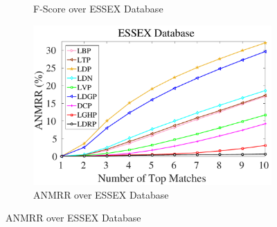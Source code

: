 \documentclass[a4paper]{article}
\begin{document}
\begin{figure}[!t]
\begin{subfigure}{.25\textwidth}
    \caption{F-Score over ESSEX Database}
    \label{fig:essex-f}
  \end{subfigure}%
    \begin{subfigure}{.25\textwidth}
    \centering
    \includegraphics[width=.98\linewidth]{essex-anmrr}
    \caption{ANMRR over ESSEX Database}
    \label{fig:essex-anmrr}
  \end{subfigure}
  \vspace{3mm}
  

\end{figure}
\end{document}
